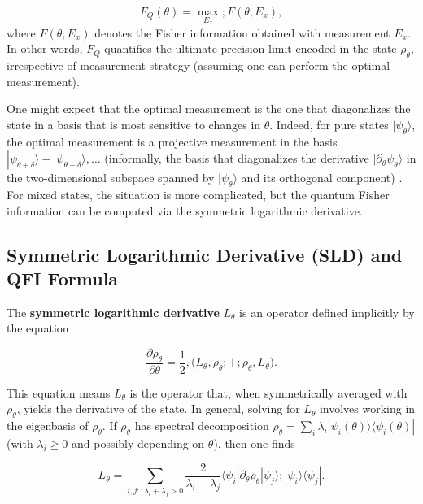 \begin{equation}
F_Q(\theta) = \max_{{E_x}} ; F(\theta;{E_x}),
\end{equation}
where $F(\theta;{E_x})$ denotes the Fisher information obtained with
measurement ${E_x}$. In other words, $F_Q$ quantifies the ultimate
precision limit encoded in the state $\rho_\theta$, irrespective of
measurement strategy (assuming one can perform the optimal
measurement).



One might expect that the optimal measurement is the one that
diagonalizes the state in a basis that is most sensitive to changes in
$\theta$. Indeed, for pure states $|\psi_\theta\rangle$, the optimal
measurement is a projective measurement in the basis
${|\psi_{\theta+\delta}\rangle - |\psi_{\theta-\delta}\rangle,
  \ldots}$ (informally, the basis that diagonalizes the derivative
$|\partial_\theta \psi_\theta\rangle$ in the two-dimensional subspace
spanned by $|\psi_\theta\rangle$ and its orthogonal component)
\cite{BraunsteinCaves1994}. For mixed states, the situation is more
complicated, but the quantum Fisher information can be computed via
the symmetric logarithmic derivative.



\subsection{Symmetric Logarithmic Derivative (SLD) and QFI Formula}



The \textbf{symmetric logarithmic derivative} $L_\theta$ is an operator defined implicitly by the equation

\begin{equation}
\frac{\partial \rho_\theta}{\partial \theta} = \frac{1}{2},\big( L_\theta,\rho_\theta ;+; \rho_\theta,L_\theta \big).
\label{eq:SLD-def}
\end{equation}

This equation means $L_\theta$ is the operator that, when
symmetrically averaged with $\rho_\theta$, yields the derivative of
the state. In general, solving for $L_\theta$ involves working in the
eigenbasis of $\rho_\theta$. If $\rho_\theta$ has spectral
decomposition $\rho_\theta = \sum_i \lambda_i
|\psi_i(\theta)\rangle\langle \psi_i(\theta)|$ (with $\lambda_i\ge0$
and possibly depending on $\theta$), then one finds

\begin{equation}
L_\theta = \sum_{i,j:;\lambda_i + \lambda_j > 0} \frac{2}{\lambda_i + \lambda_j} \langle \psi_i|\partial_\theta \rho_\theta|\psi_j \rangle ;|\psi_i\rangle\langle \psi_j|.
\label{eq:SLD-eigenbasis}
\end{equation}

